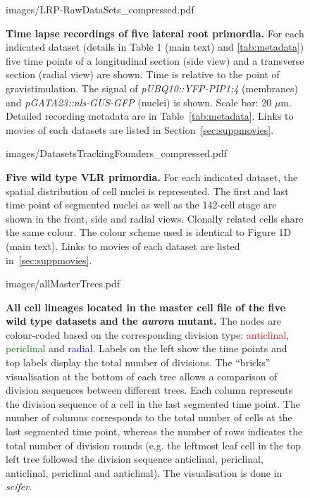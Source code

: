 \documentclass[11pt,a4paper, final]{article}
\begin{document}
%
\clearpage
%
\begin{figure}[htbp]
\centering
	\begin{overpic}[width=1.\linewidth]{images/LRP-RawDataSets_compressed.pdf}
	\end{overpic}
\caption[Time lapse recordings of five lateral root primordia.]
{{\bf Time lapse recordings of five lateral root primordia.} For each indicated dataset (details in Table 1 (main text) and \ref{tab:metadata}) five time points of a longitudinal section (side view) and a transverse section (radial view) are shown. Time is relative to the point of gravistimulation. The signal of \textit{pUBQ10::YFP-PIP1;4} (membranes) and \textit{pGATA23::nls-GUS-GFP} (nuclei) is shown. Scale bar: 20 $\mu$m. Detailed recording metadata are in Table~\ref{tab:metadata}. Links to movies of each datasets are listed in Section~\ref{sec:suppmovies}.}
	\label{fig:alldatasets}
\end{figure}
%
\clearpage
\begin{figure}[htbp]
\centering
	\begin{overpic}[width=1.\linewidth]{images/DatasetsTrackingFounders_compressed.pdf}
	\end{overpic}
\caption[Five wild type VLR primordia.]
{{\bf Five wild type VLR primordia.} For each indicated dataset, the spatial distribution of cell nuclei is represented. The first and last time point of segmented nuclei as well as the 142-cell stage are shown in the front, side and radial views. Clonally related cells share the same colour. The colour scheme used is identical to Figure 1D (main text). Links to movies of each dataset are listed in~\ref{sec:suppmovies}.}
	\label{fig:trackingfounders}
\end{figure}
%
\clearpage
%
\begin{figure}[htbp]
\centering
		\begin{overpic}[width=.85\linewidth]{images/allMasterTrees.pdf}
		\end{overpic}
\caption[All cell lineages located in the master cell file of the five wild type datasets and the \emph{aurora} mutant.]
{
{\bf All cell lineages located in the master cell file of the five wild type datasets and the \emph{aurora} mutant.} The nodes are colour-coded based on the corresponding division type: \textcolor{red}{anticlinal}, \textcolor{green}{periclinal} and \textcolor{blue}{radial}. Labels on the left show the time points and top labels display the total number of divisions. The ``bricks'' visualisation at the bottom of each tree allows a comparison of division sequences between different trees. Each column represents the division sequence of a cell in the last segmented time point. The number of columns corresponds to the total number of cells at the last segmented time point, whereas the number of rows indicates the total number of division rounds (e.g. the leftmost leaf cell in the top left tree followed the division sequence anticlinal, periclinal, anticlinal, periclinal and anticlinal). The visualisation is done in \textit{scifer}.
}
	\label{fig:allMasterTrees}
\end{figure}
\end{document}
